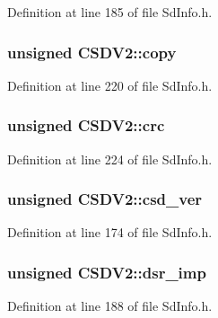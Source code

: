 Definition at line 185 of file Sd\+Info.\+h.

\subsubsection[{\texorpdfstring{copy}{copy}}]{\setlength{\rightskip}{0pt plus 5cm}unsigned C\+S\+D\+V2\+::copy}\hypertarget{struct_c_s_d_v2_a94c3a6332d4905be59800fd59aafe5ff}{}\label{struct_c_s_d_v2_a94c3a6332d4905be59800fd59aafe5ff}


Definition at line 220 of file Sd\+Info.\+h.

\subsubsection[{\texorpdfstring{crc}{crc}}]{\setlength{\rightskip}{0pt plus 5cm}unsigned C\+S\+D\+V2\+::crc}\hypertarget{struct_c_s_d_v2_a099f7c6b9acbfa6b733fe4ab94c10ccc}{}\label{struct_c_s_d_v2_a099f7c6b9acbfa6b733fe4ab94c10ccc}


Definition at line 224 of file Sd\+Info.\+h.

\subsubsection[{\texorpdfstring{csd\+\_\+ver}{csd\_ver}}]{\setlength{\rightskip}{0pt plus 5cm}unsigned C\+S\+D\+V2\+::csd\+\_\+ver}\hypertarget{struct_c_s_d_v2_a59dccb194acb31b218f94f2fbb81f92b}{}\label{struct_c_s_d_v2_a59dccb194acb31b218f94f2fbb81f92b}


Definition at line 174 of file Sd\+Info.\+h.

\subsubsection[{\texorpdfstring{dsr\+\_\+imp}{dsr\_imp}}]{\setlength{\rightskip}{0pt plus 5cm}unsigned C\+S\+D\+V2\+::dsr\+\_\+imp}\hypertarget{struct_c_s_d_v2_a125f8388263cb94ac83fea63e1e375f5}{}\label{struct_c_s_d_v2_a125f8388263cb94ac83fea63e1e375f5}


Definition at line 188 of file Sd\+Info.\+h.

